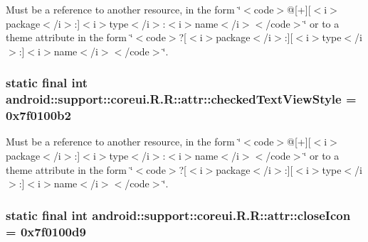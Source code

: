 Must be a reference to another resource, in the form \char`\"{}$<$code$>$@\mbox{[}+\mbox{]}\mbox{[}$<$i$>$package$<$/i$>$:\mbox{]}$<$i$>$type$<$/i$>$:$<$i$>$name$<$/i$>$$<$/code$>$\char`\"{} or to a theme attribute in the form \char`\"{}$<$code$>$?\mbox{[}$<$i$>$package$<$/i$>$:\mbox{]}\mbox{[}$<$i$>$type$<$/i$>$:\mbox{]}$<$i$>$name$<$/i$>$$<$/code$>$\char`\"{}. \hypertarget{classandroid_1_1support_1_1coreui_1_1_r_1_1attr_33d9468e8b813421afbf137f4e6e104b}{
\subsubsection[{checkedTextViewStyle}]{\setlength{\rightskip}{0pt plus 5cm}static final int android::support::coreui.R.R::attr::checkedTextViewStyle = 0x7f0100b2}}
\label{classandroid_1_1support_1_1coreui_1_1_r_1_1attr_33d9468e8b813421afbf137f4e6e104b}


Must be a reference to another resource, in the form \char`\"{}$<$code$>$@\mbox{[}+\mbox{]}\mbox{[}$<$i$>$package$<$/i$>$:\mbox{]}$<$i$>$type$<$/i$>$:$<$i$>$name$<$/i$>$$<$/code$>$\char`\"{} or to a theme attribute in the form \char`\"{}$<$code$>$?\mbox{[}$<$i$>$package$<$/i$>$:\mbox{]}\mbox{[}$<$i$>$type$<$/i$>$:\mbox{]}$<$i$>$name$<$/i$>$$<$/code$>$\char`\"{}. \hypertarget{classandroid_1_1support_1_1coreui_1_1_r_1_1attr_dfe6a2c11c63a8e014e54a0094313fe4}{
\subsubsection[{closeIcon}]{\setlength{\rightskip}{0pt plus 5cm}static final int android::support::coreui.R.R::attr::closeIcon = 0x7f0100d9}}
\label{classandroid_1_1support_1_1coreui_1_1_r_1_1attr_dfe6a2c11c63a8e014e54a0094313fe4}


